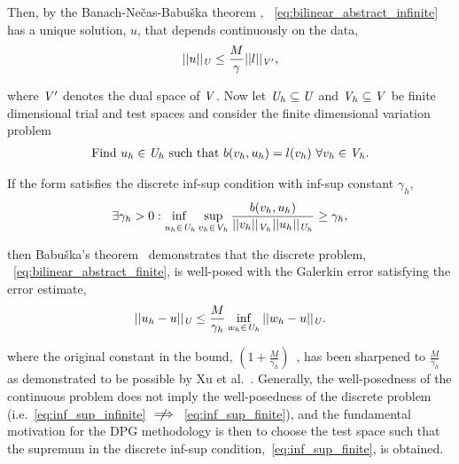 Then, by the Banach-Ne\v{c}as-Babu\v{s}ka theorem ,
~\eqref{eq:bilinear_abstract_infinite} has a unique solution, $u$, that depends continuously on the data,
\begin{align}
||u||_{\mathit{{{U}}}} \le \frac{M}{\gamma} ||l||_{\mathit{{{V}}}'},
\end{align}

where $\mathit{{{V}}}'$ denotes the dual space of $\mathit{{{V}}}$. Now let $\mathit{{{U}}}_h \subseteq \mathit{{{U}}}$ and $\mathit{{{V}}}_h
\subseteq \mathit{{{V}}}$ be finite dimensional trial and test spaces and consider the finite dimensional variation problem
\begin{align} \label{eq:bilinear_abstract_finite}
\text{Find}\ u_h \in \mathit{{{U}}}_h\ \text{such that}\
b(v_h,u_h) = l(v_h)\ \forall v_h \in \mathit{{{V}}}_h.
\end{align}

If the form satisfies the discrete inf-sup condition with inf-sup constant $\gamma_h$,
\begin{align} \label{eq:inf_sup_finite}
\exists \gamma_h > 0 :
\adjustlimits\inf_{u_h\in\fspace{U}_h} \sup_{v_h\in\fspace{V}_h}
\frac{b(v_h,u_h)}{||v_h||_{\fspace{V}_h}||u_h||_{\fspace{U}_h}} \ge \gamma_h,
\end{align}

then Babu\v{s}ka's theorem~\cite[Theorem ]{Babuska1971} demonstrates that the discrete problem,
~\eqref{eq:bilinear_abstract_finite}, is well-posed with the Galerkin error satisfying the error estimate,
\begin{align} \label{eq:abstract_dpg_error}
||u_h-u||_{\mathit{{{U}}}} \le \frac{M}{\gamma_h} \inf_{w_h \in \mathit{{{U}}}_h} ||w_h-u||_{\mathit{{{U}}}}.
\end{align}

where the original constant in the bound, $\left( 1 + \frac{M}{\gamma_h} \right)$~\cite[eq. ()]{Babuska1971}, has been
sharpened to $\frac{M}{\gamma_h}$ as demonstrated to be possible by Xu et al.~\cite[Theorem \makeblue{2}]{Xu2003}.
Generally, the well-posedness of the continuous problem does not imply the well-posedness of the discrete problem
(i.e.~\eqref{eq:inf_sup_infinite} $\centernot\implies$~\eqref{eq:inf_sup_finite}), and the fundamental motivation for
the DPG methodology is then to choose the test space such that the supremum in the discrete inf-sup
condition,~\eqref{eq:inf_sup_finite}, is obtained. 


